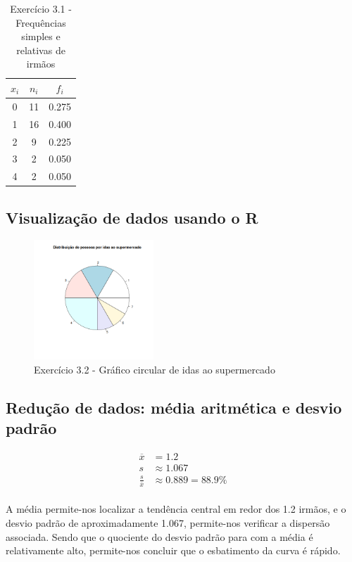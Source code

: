 \documentclass[11pt,a4paper]{article}
\begin{document}
\begin{table}[h!]
	\centering
	\begin{tabular}{|c|c|c|}
		\hline
		$x_i$&$n_i$&$f_i$ \\
		\hline
		0&11&0.275\\
		\hline
		1&16&0.400\\
		\hline
		2& 9&0.225\\
		\hline
		3& 2&0.050\\
		\hline
		4& 2&0.050\\
		\hline
	\end{tabular}
	\caption{Exercício 3.1 - Frequências simples e relativas de irmãos}
	\label{tab:3.1}
\end{table}


\subsection{Visualização de dados usando o R}

\begin{figure}[h!]
	\centering
	\includegraphics[width=0.4\textwidth]{./recursos/ex3_2.png}
	\caption{Exercício 3.2 - Gráfico circular de idas ao supermercado}
\end{figure}


\clearpage
\subsection{Redução de dados: média aritmética e desvio padrão}

\begin{align*}
	\overline{x} &= 1.2\\
	s &\approx 1.067 \\
	\frac{s}{\overline{x}} &\approx 0.889 = 88.9 \%
\end{align*}

\paragraph{} A média permite-nos localizar a tendência central em redor dos
1.2 irmãos, e o desvio padrão de aproximadamente 1.067, permite-nos verificar
a dispersão associada. Sendo que o quociente do desvio padrão para com a média
é relativamente alto, permite-nos concluir que o esbatimento da curva é
rápido.
\end{document}
